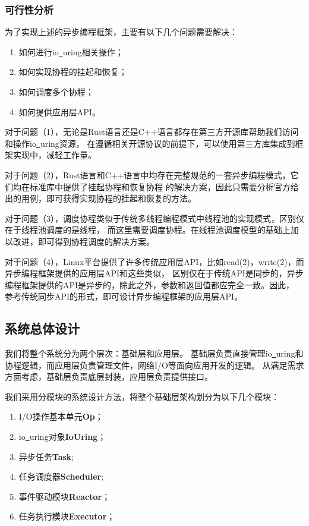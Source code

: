 \documentclass[supercite]{HustGraduPaper}
\theoremstyle{definition}
\begin{document}
\subsubsection{可行性分析}
为了实现上述的异步编程框架，主要有以下几个问题需要解决：
\begin{enumerate}
  \item 如何进行io\underline{~}uring相关操作；
  \item 如何实现协程的挂起和恢复；
  \item 如何调度多个协程；
  \item 如何提供应用层API。
\end{enumerate}

对于问题（1），无论是Rust语言还是C++语言都存在第三方开源库帮助我们访问和操作io\underline{~}uring资源，
在遵循相关开源协议的前提下，可以使用第三方库集成到框架实现中，减轻工作量。\par

对于问题（2），Rust语言和C++语言中均存在完整规范的一套异步编程模式，它们均在标准库中提供了挂起协程和恢复协程
的解决方案，因此只需要分析官方给出的用例，即可获得实现协程的挂起和恢复的方法。\par

对于问题（3），调度协程类似于传统多线程编程模式中线程池的实现模式，区别仅在于线程池调度的是线程，
而这里需要调度协程。在线程池调度模型的基础上加以改进，即可得到协程调度的解决方案。\par

对于问题（4），Linux平台提供了许多传统应用层API，比如read(2)，write(2)，而异步编程框架提供的应用层API和这些类似，
区别仅在于传统API是同步的，异步编程框架提供的API是异步的，除此之外，参数和返回值都应完全一致。因此，
参考传统同步API的形式，即可设计异步编程框架的应用层API。\par

\subsection{系统总体设计}

我们将整个系统分为两个层次：基础层和应用层。
基础层负责直接管理io\underline{~}uring和协程逻辑，而应用层负责管理文件，网络I/O等面向应用开发的逻辑。
从满足需求方面考虑，基础层负责底层封装，应用层负责提供接口。\par

我们采用分模块的系统设计方法，将整个基础层架构划分为以下几个模块：

\begin{enumerate}
  \item I/O操作基本单元\textbf{Op}；
  \item io\underline{~}uring对象\textbf{IoUring}；
  \item 异步任务\textbf{Task};
  \item 任务调度器\textbf{Scheduler};
  \item 事件驱动模块\textbf{Reactor}；
  \item 任务执行模块\textbf{Executor}；
\end{enumerate}
\end{document}
